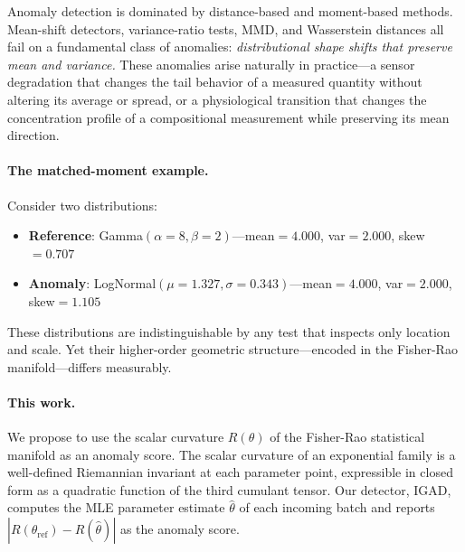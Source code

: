 \documentclass[12pt]{article}
\begin{document}
Anomaly detection is dominated by distance-based and moment-based methods.
Mean-shift detectors, variance-ratio tests, MMD, and Wasserstein distances all
fail on a fundamental class of anomalies: \emph{distributional shape shifts that
preserve mean and variance.} These anomalies arise naturally in practice---a
sensor degradation that changes the tail behavior of a measured quantity without
altering its average or spread, or a physiological transition that changes the
concentration profile of a compositional measurement while preserving its mean
direction.

\paragraph{The matched-moment example.}
Consider two distributions:
\begin{itemize}
  \item \textbf{Reference}: Gamma$(\alpha{=}8,\beta{=}2)$---mean$=4.000$, var$=2.000$, skew$=0.707$
  \item \textbf{Anomaly}: LogNormal$(\mu{=}1.327, \sigma{=}0.343)$---mean$=4.000$, var$=2.000$, skew$=1.105$
\end{itemize}
These distributions are indistinguishable by any test that inspects only location
and scale. Yet their higher-order geometric structure---encoded in the Fisher-Rao
manifold---differs measurably.

\paragraph{This work.}
We propose to use the scalar curvature $R(\theta)$ of the Fisher-Rao statistical
manifold as an anomaly score. The scalar curvature of an exponential family is a
well-defined Riemannian invariant at each parameter point, expressible in closed
form as a quadratic function of the third cumulant tensor. Our detector, IGAD,
computes the MLE parameter estimate $\hat{\theta}$ of each incoming batch and
reports $|R(\theta_{\mathrm{ref}}) - R(\hat{\theta})|$ as the anomaly score.
\end{document}
